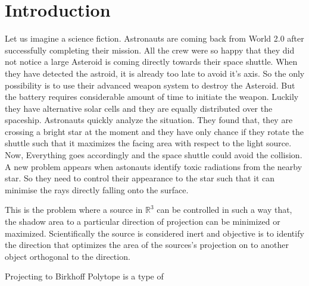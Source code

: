 
\chapter{Introduction} %

\label{ChapterX} %


Let us imagine a science fiction. Astronauts are coming back from World 2.0 after successfully completing their mission. All the crew were so happy that they did not notice a large Asteroid is coming directly towards their space shuttle. When they have detected the astroid, it is already too late to avoid it's axis. So the only possibility is to use their advanced weapon system to destroy the Asteroid. But the battery requires considerable amount of time to initiate the weapon. Luckily they have alternative solar cells and they are equally distributed over the spaceship. Astronauts quickly analyze the situation. They found that, they are crossing a bright star at the moment and they have only chance if they rotate the shuttle such that it maximizes the facing area with respect to the light source. Now, Everything goes accordingly and the space shuttle could avoid the collision. A new problem appears when astonauts identify toxic radiations from the nearby star. So they need to control their appearance to the star such that it can minimise the rays directly falling onto the surface. 


This is the problem where a source in $\mathbb{R}^3$ can be controlled in such a way that, the shadow area to a particular direction of projection can be minimized or maximized. Scientifically the source is considered inert and objective is to identify the direction that optimizes the area of the sources's projection on to another object orthogonal to the direction.

 
 
































Projecting to Birkhoff Polytope is a type of 


